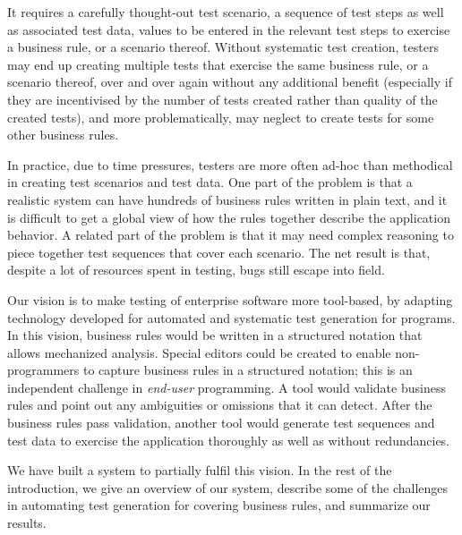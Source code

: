
It requires a carefully thought-out test scenario, \ie a sequence of test steps
as well as associated test data, \ie values to be entered in the relevant test
steps to exercise a business rule, or a scenario thereof.  Without systematic
test creation, testers may end up creating multiple tests that exercise the same
business rule, or a scenario thereof, over and over again without any additional
benefit (especially if they are incentivised by the number of tests created
rather than quality of the created tests), and more problematically, may neglect
to create tests for some other business rules.

In practice, due to time pressures, testers are more often ad-hoc than
methodical in creating test scenarios and test data.  One part of the problem is
that a realistic system can have hundreds of business rules written in plain
text, and it is difficult to get a global view of how the rules together
describe the application behavior.  A related part of the problem is that it may
need complex reasoning to piece together test sequences that cover each
scenario.  The net result is that, despite a lot of resources spent in testing,
bugs still escape into field.


Our vision is to make testing of enterprise software more tool-based, by
adapting technology developed for automated and systematic test generation for
programs. In this vision, business rules would be written in a structured
notation that allows mechanized analysis.  Special editors could be created
to enable non-programm\-ers to capture business rules in a structured notation;
this is an independent challenge in \textit{end-user} programming.  A tool would
validate business rules and point out any ambiguities or omissions that it can
detect.  After the business rules pass validation, another tool would generate
test sequences and test data to exercise the application thoroughly as well as
without redundancies.

We have built a system to partially fulfil this vision.  In the rest of the
introduction, we give an overview of our system, describe some of the challenges
in automating test generation for covering business rules, and summarize our
results.

